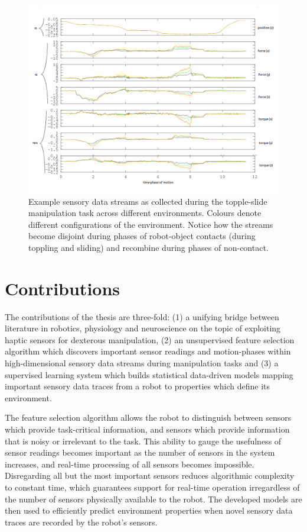 \begin{figure}[hbt]
	\centering
	\includegraphics[width=\linewidth]{images/eg_sensor_trace}
	\caption{Example sensory data streams as collected during the topple-slide manipulation task across different environments.
Colours denote different configurations of the environment.
Notice how the streams become disjoint during phases of robot-object contacts (during toppling and sliding) and recombine during phases of non-contact.}
	\label{fig:eg_sensor_trace}
\end{figure}





\section{Contributions}
The contributions of the thesis are three-fold: 
(1) a unifying bridge between literature in robotics, physiology and neuroscience on the topic of exploiting haptic sensors for dexterous manipulation, 
(2) an unsupervised feature selection algorithm which discovers important sensor readings and motion-phases within high-dimensional sensory data streams during manipulation tasks and 
(3) a supervised learning system which builds statistical data-driven models mapping important sensory data traces from a robot to properties which define its environment.

The feature selection algorithm allows the robot to distinguish between sensors which provide task-critical information, and sensors which provide information that is noisy or irrelevant to the task.
This ability to gauge the usefulness of sensor readings becomes important as the number of sensors in the system increases, and real-time processing of all sensors becomes impossible.
Disregarding all but the most important sensors reduces algorithmic complexity to constant time, which guarantees support for real-time operation irregardless of the number of sensors physically available to the robot.
The developed models are then used to efficiently predict environment properties when novel sensory data traces are recorded by the robot's sensors.

